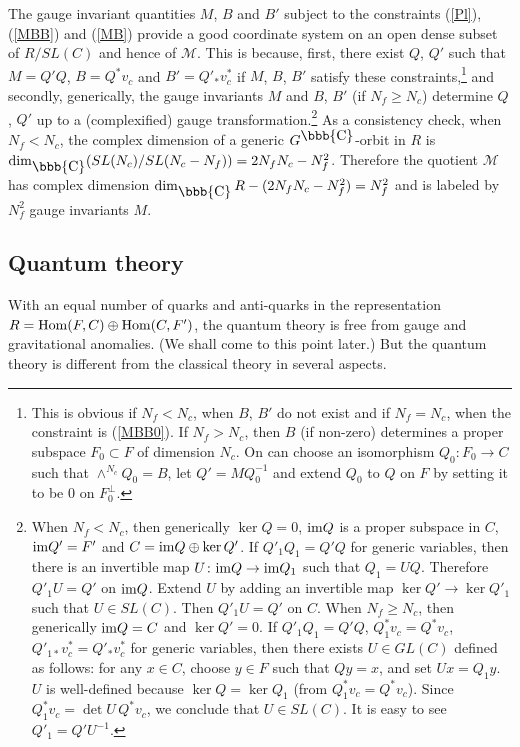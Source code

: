 \documentclass[lecture]{qft-l}
\newcommand{\co}{{\mbox{\bbb{C}}}}
\newcommand{\im}{{\rm im}}
\newcommand{\MM}{{\mathcal M}}
\newcommand{\Hom}{{\rm Hom}}
\newcommand{\FT}{F'}%
\newcommand{\QT}{Q'}%
\newcommand{\BT}{B'}%
\numberwithin{figure}{chapter}
\begin{document}
The gauge invariant quantities $M$, $B$ and $\BT$ subject to the constraints
(\ref{Pl}), (\ref{MBB}) and (\ref{MB}) provide a good coordinate system on
an open dense subset of $R/SL(C)$ and hence of $\MM$.
This is because, first, there exist $Q$, $\QT$ such that $M=\QT Q$, 
$B=Q^*v_c$ and $\BT=\QT_*v_c^*$ if $M$, $B$, $\BT$ satisfy these 
constraints,\footnote{This is obvious if $N_f<N_c$, when $B$, $\BT$ do not 
exist and if $N_f=N_c$, when the constraint is (\ref{MBB0}).
If $N_f>N_c$, then $B$ (if non-zero) determines a proper subspace 
$F_0\subset F$ of dimension $N_c$.
On can choose an isomorphism $Q_0\colon F_0\to C$ such that 
$\wedge^{N_c}Q_0=B$, let $\QT=MQ_0^{-1}$ and extend $Q_0$ to $Q$ on $F$ by 
setting it to be $0$ on $F_0^\perp$.}
and secondly, generically, the gauge invariants $M$ and $B$, $\BT$ 
(if $N_f\ge N_c$) determine $Q$, $\QT$ up to a (complexified) gauge
transformation.\footnote{When $N_f<N_c$, then generically $\ker Q=0$,
$\im Q$ is a proper subspace 
in $C$, $\im\QT=\FT$ and $C=\im Q\oplus\ker\QT$.
If $\QT_1Q_1=\QT Q$ for generic variables, then there is an invertible map 
$U\colon\im Q\to\im Q_1$ such that $Q_1=UQ$.
Therefore $\QT_1U=\QT$ on $\im Q$.
Extend $U$ by adding an invertible map $\ker\QT\to\ker\QT_1$ such that
$U\in SL(C)$.
Then $\QT_1U=\QT$ on $C$.
When $N_f\ge N_c$, then generically $\im Q=C$ and $\ker\QT=0$.
If $\QT_1Q_1=\QT Q$, $Q_1^*v_c=Q^*v_c$, $\QT_{1*}v_c^*=\QT_*v_c^*$
for generic variables, then there exists $U\in GL(C)$ defined as follows:
for any $x\in C$, choose $y\in F$ such that $Qy=x$, and set $Ux=Q_1y$.
$U$ is well-defined because $\ker Q=\ker Q_1$ (from $Q_1^*v_c=Q^*v_c$).
Since $Q_1^*v_c=\det U\,Q^*v_c$, we conclude that $U\in SL(C)$.
It is easy to see $\QT_1=\QT U^{-1}$.}
As a consistency check, when $N_f<N_c$, the complex dimension of a generic
$G^\co$-orbit in $R$ is $\dim_\co(SL(N_c)/SL(N_c-N_f))=2N_fN_c-N_f^2$.
Therefore the quotient $\MM$ has complex dimension 
$\dim_\co R-(2N_fN_c-N_f^2)=N_f^2$ and is labeled by $N_f^2$ gauge invariants
$M$.

\subsection{Quantum theory}

With an equal number of quarks and 
anti-quarks in the representation\break
$R=\Hom(F,C)\oplus\Hom(C,\FT)$, the quantum theory is free from gauge 
and gravitational anomalies.
(We shall come to this point later.)
But the quantum theory is different from the classical theory in several 
aspects.
\end{document}
